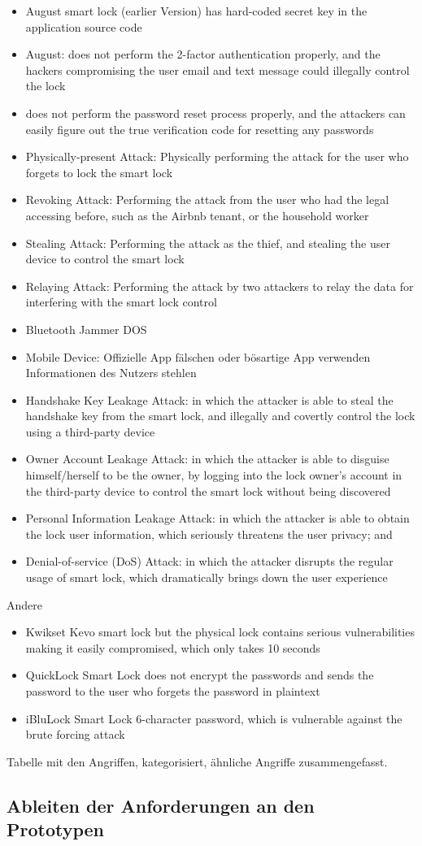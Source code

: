 	\begin{itemize}
		\item August smart lock (earlier Version) has hard-coded secret key in the application source code \cite{Rose2016}
		\item August: does not perform the 2-factor authentication properly, and the hackers compromising the user email and text message could illegally control the lock
		\item does not perform the password reset process properly, and the	attackers can easily figure out the true verification code for resetting any passwords
		\item Physically-present Attack: Physically performing the attack for the user	who forgets to lock the smart lock
		\item Revoking Attack: Performing the attack from the user who had the legal accessing before, such as the Airbnb tenant, or the household worker
		\item Stealing Attack: Performing the attack as the thief, and stealing the user device to control the smart lock
		\item Relaying Attack: Performing the attack by two attackers to relay the data for interfering with the smart lock control
		\item Bluetooth Jammer \textrightarrow DOS
		\item Mobile Device: Offizielle App fälschen oder bösartige App verwenden \textrightarrow Informationen des Nutzers stehlen \textrightarrow 
		\item Handshake Key Leakage Attack: in which the attacker is able to steal the handshake key from the smart lock, and	illegally and covertly control the lock using a third-party	device
		\item Owner Account Leakage Attack: in which the attacker is able to disguise himself/herself to be the owner, by logging into the lock owner’s account in the third-party device to control the smart lock without being discovered
		\item Personal Information Leakage Attack: in which the attacker is able to obtain the lock user information, which seriously threatens the user privacy; and
		\item Denial-of-service (DoS) Attack: in which the attacker disrupts the regular usage of smart lock, which dramatically	brings down the user experience
	\end{itemize}

	Andere
	\begin{itemize}
		\item Kwikset Kevo smart lock but the physical lock contains serious vulnerabilities making it easily compromised, which only takes 10 seconds\cite{Ye2017}
		\item QuickLock Smart Lock does not encrypt the passwords and sends the password to the user who forgets the password in plaintext\cite{Ye2017}
		\item iBluLock Smart Lock 6-character password, which is vulnerable against the brute forcing attack\cite{Ye2017}
	\end{itemize}

	Tabelle mit den Angriffen, kategorisiert, ähnliche Angriffe zusammengefasst.
	
	
	\subsection{Ableiten der Anforderungen an den Prototypen}
	\label{sec:requirements_prototype}
		
